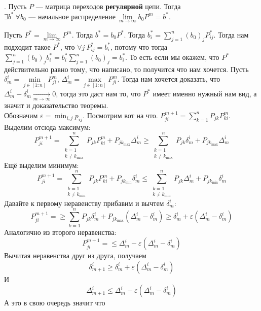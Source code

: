 \documentclass{article}
\begin{document}
\begin{itemize}
        \thm {}. Пусть $P$ --- матрица переходов \textbf{регулярной} цепи. Тогда $\exists b^*~\forall b_0\text{ --- начальное распределение}~\lim\limits_{m\to\infty}b_0P^m=b^*$.
        \begin{Proof}
            Пусть $P^*=\lim\limits_{m\to\infty}P^m$. Тогда $b^*=b_0P^*$. Тогда $b_i^*=\sum\limits_{j=1}^n(b_0)_jP^*_{ij}$. Тогда нам подходит такое $P^*$, что $\forall j~P^*_{ij}=b^*_i$, потому что тогда $\sum\limits_{j=1}^n(b_0)_jb^*_i=b^*_i\sum\limits_{j=1}^n(b_0)_j=b^*_i$. То есть если мы окажем, что $P^*$ действительно равно тому, что написано, то получится что нам хочется. Пусть $\delta_m^i=\min\limits_{j\in[1:n]}P^m_{ji}$, $\Delta_m^i=\max\limits_{j\in[1:n]}P^m_{ji}$. Тогда нам хочется доказать, что $\Delta_m^i-\delta_m^i\underset{m\to\infty}\longrightarrow0$, тогда это даст нам то, что $P^*$ имеет именно нужный нам вид, а значит и доказательство теоремы.\\
            Обозначим $\varepsilon=\min_{i,j}p_{ij}$. Посмотрим вот на что. $P^{m+1}_{ji}=\sum\limits_{k=1}^nP_{jk}P^m_{ki}$. Выделим отсюда максимум:
            $$
            P^{m+1}_{ji}=\sum\limits_{\substack{k=1\\k\neq k_{\max}}}^nP_{jk}P^m_{ki}+P_{jk_{\max}}\Delta_m^i\geqslant
            \sum\limits_{\substack{k=1\\k\neq k_{\max}}}^nP_{jk}\delta_m^i+P_{jk_{\max}}\Delta_m^i
            $$
            Ещё выделим минимум:
            $$
            P^{m+1}_{ji}=\sum\limits_{\substack{k=1\\k\neq k_{\min}}}^nP_{jk}P^m_{ki}+P_{jk_{\min}}\delta_m^i\leqslant
            \sum\limits_{\substack{k=1\\k\neq k_{\min}}}^nP_{jk}\Delta_m^i+P_{jk_{\min}}\delta_m^i
            $$
            Давайте к первому неравенству прибавим и вычтем $\delta_m^i$:
            $$
            P^{m+1}_{ji}=\geqslant
            \sum\limits_{k=1}^nP_{jk}\delta_m^i+P_{jk_{\max}}(\Delta_m^i-\delta_m^i)\geqslant\delta_m^i+\varepsilon(\Delta_m^i-\delta_m^i)
            $$
            Аналогично из второго неравенства:
            $$
            P^{m+1}_{ji}=\leqslant\Delta_m^i-\varepsilon(\Delta_m^i-\delta_m^i)
            $$
            Вычитая неравенства друг из друга, получаем
            $$
            \delta_{m+1}^i\geqslant\delta_m^i+\varepsilon(\Delta_m^i-\delta_m^i)
            $$
            И
            $$
            \Delta_{m+1}^i\leqslant\Delta_m^i-\varepsilon(\Delta_m^i-\delta_m^i)
            $$
            А это в свою очередь значит что

\end{Proof}
\end{itemize}
\end{document}
